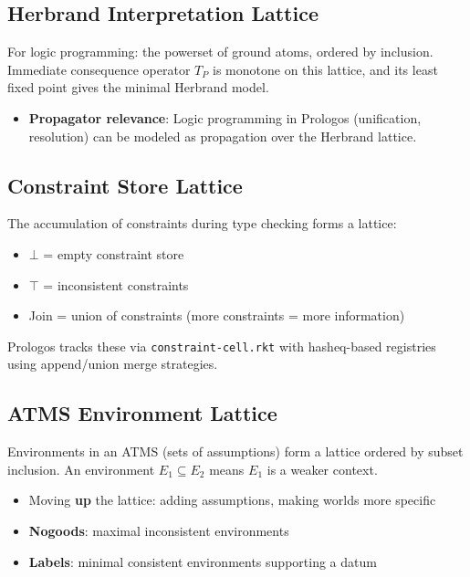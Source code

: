 \documentclass[11pt]{article}
\begin{document}
\subsection{Herbrand Interpretation Lattice}
\label{sec:org5fa162d}

For logic programming: the powerset of ground atoms, ordered by inclusion.
Immediate consequence operator \(T_P\) is monotone on this lattice, and its least
fixed point gives the minimal Herbrand model.

\begin{itemize}
\item \textbf{Propagator relevance}: Logic programming in Prologos (unification, resolution)
can be modeled as propagation over the Herbrand lattice.
\end{itemize}
\subsection{Constraint Store Lattice}
\label{sec:org1bebbdd}

The accumulation of constraints during type checking forms a lattice:

\begin{itemize}
\item \(\bot\) = empty constraint store
\item \(\top\) = inconsistent constraints
\item Join = union of constraints (more constraints = more information)
\end{itemize}

Prologos tracks these via \texttt{constraint-cell.rkt} with hasheq-based registries
using append/union merge strategies.
\subsection{ATMS Environment Lattice}
\label{sec:org758bf10}

Environments in an ATMS (sets of assumptions) form a lattice ordered by subset
inclusion. An environment \(E_1 \subseteq E_2\) means \(E_1\) is a weaker context.

\begin{itemize}
\item Moving \textbf{up} the lattice: adding assumptions, making worlds more specific
\item \textbf{Nogoods}: maximal inconsistent environments
\item \textbf{Labels}: minimal consistent environments supporting a datum
\end{itemize}
\end{document}
